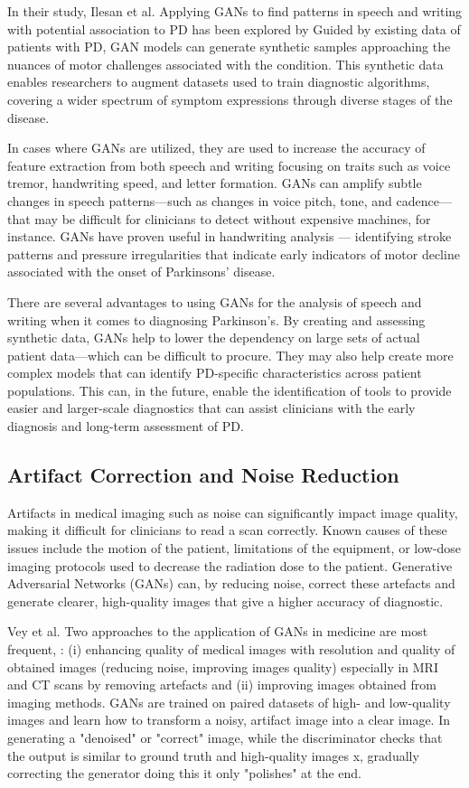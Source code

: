 \documentclass[12pt]{article}
\begin{document}
In their study, Ilesan et al. Applying GANs to find patterns in speech and writing with potential association to PD has been explored by \cite{Ilesan2024} Guided by existing data of patients with PD, GAN models can generate synthetic samples approaching the nuances of motor challenges associated with the condition. This synthetic data enables researchers to augment datasets used to train diagnostic algorithms, covering a wider spectrum of symptom expressions through diverse stages of the disease.

In cases where GANs are utilized, they are used to increase the accuracy of feature extraction from both speech and writing focusing on traits such as voice tremor, handwriting speed, and letter formation. GANs can amplify subtle changes in speech patterns—such as changes in voice pitch, tone, and cadence—that may be difficult for clinicians to detect without expensive machines, for instance. GANs have proven useful in handwriting analysis — identifying stroke patterns and pressure irregularities that indicate early indicators of motor decline associated with the onset of Parkinsons' disease.

There are several advantages to using GANs for the analysis of speech and writing when it comes to diagnosing Parkinson's. By creating and assessing synthetic data, GANs help to lower the dependency on large sets of actual patient data—which can be difficult to procure. They may also help create more complex models that can identify PD-specific characteristics across patient populations. This can, in the future, enable the identification of tools to provide easier and larger-scale diagnostics that can assist clinicians with the early diagnosis and long-term assessment of PD.

\subsection{Artifact Correction and Noise Reduction}

Artifacts in medical imaging such as noise can significantly impact image quality, making it difficult for clinicians to read a scan correctly. Known causes of these issues include the motion of the patient, limitations of the equipment, or low-dose imaging protocols used to decrease the radiation dose to the patient. Generative Adversarial Networks (GANs) can, by reducing noise, correct these artefacts and generate clearer, high-quality images that give a higher accuracy of diagnostic.

Vey et al. Two approaches to the application of GANs in medicine are most frequent, \cite{Vey2019}: (i) enhancing quality of medical images with resolution and quality of obtained images (reducing noise, improving images quality) especially in MRI and CT scans by removing artefacts and (ii) improving images obtained from imaging methods. GANs are trained on paired datasets of high- and low-quality images and learn how to transform a noisy, artifact image into a clear image. In generating a "denoised" or "correct" image, while the discriminator checks that the output is similar to ground truth and high-quality images x, gradually correcting the generator doing this it only "polishes" at the end.
\end{document}
